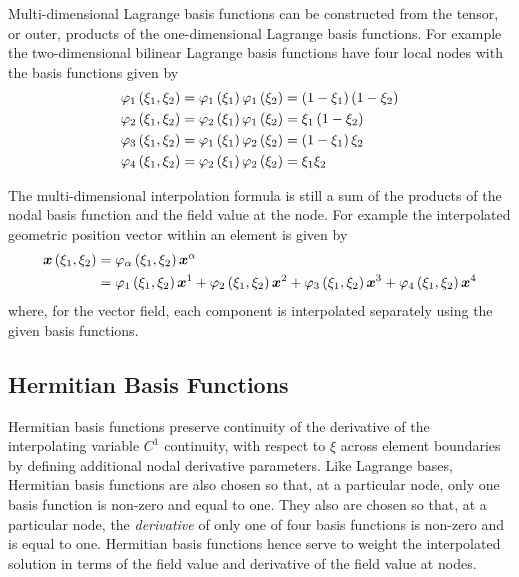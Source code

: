 Multi-dimensional Lagrange basis functions can be constructed from the tensor,
or outer, products of the one-dimensional Lagrange basis functions. For
example the two-dimensional bilinear Lagrange basis functions have four local
nodes with the basis functions given by
\begin{equation}
  \begin{split}
       \varphi_{1} \left( \xi_{1},\xi_{2} \right)  &=   \varphi_{1} \left( \xi_{1} \right)     \varphi_{1} \left( \xi_{2} \right)  =
    \left( 1-\xi_{1} \right)\left( 1-\xi_{2} \right)\\
       \varphi_{2} \left( \xi_{1},\xi_{2} \right)  &=   \varphi_{2} \left( \xi_{1} \right)     \varphi_{1} \left( \xi_{2} \right)  =
    \xi_{1}\left( 1-\xi_{2} \right)\\
       \varphi_{3} \left( \xi_{1},\xi_{2} \right)  &=   \varphi_{1} \left( \xi_{1} \right)     \varphi_{2} \left( \xi_{2} \right)  =
    \left( 1-\xi_{1} \right)\xi_{2} \\
       \varphi_{4} \left( \xi_{1},\xi_{2} \right)  &=   \varphi_{2} \left( \xi_{1} \right)     \varphi_{2} \left( \xi_{2} \right)  =
    \xi_{1}\xi_{2}
  \end{split}
\end{equation}

The multi-dimensional interpolation formula is still a sum of the products of
the nodal basis function and the field value at the node. For example the
interpolated geometric position vector within an element is given by
\begin{equation}
  \begin{split}
    \fnof{\vect{x}}{\xione,\xitwo}&=\lbfn{\alpha}{\xione,\xitwo}
    \nodept{\vect{x}}{\alpha}\\
    &=\lbfn{1}{\xione,\xitwo}\nodept{\vect{x}}{1}+\lbfn{2}{\xione,\xitwo}
    \nodept{\vect{x}}{2}+\lbfn{3}{\xione,\xitwo}\nodept{\vect{x}}{3}+
    \lbfn{4}{\xione,\xitwo}\nodept{\vect{x}}{4}
  \end{split}
\end{equation}
where, for the vector field, each component is interpolated separately using
the given basis functions.

\subsection{Hermitian Basis Functions}
\label{sec:Hermitianbasisfunctions}

Hermitian basis functions preserve continuity of the derivative of the
interpolating variable \ie $C^{1}$ continuity, with respect to $\xi$ across
element boundaries by defining additional nodal derivative parameters. Like
Lagrange bases, Hermitian basis functions are also chosen so that, at a
particular node, only one basis function is non-zero and equal to one. They
also are chosen so that, at a particular node, the \emph{derivative} of only
one of four basis functions is non-zero and is equal to one. Hermitian basis
functions hence serve to weight the interpolated solution in terms of the
field value and derivative of the field value at nodes.

